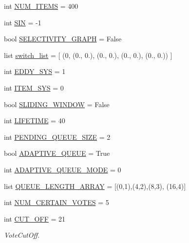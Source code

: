\begin{DoxyCompactItemize}
int \mbox{\hyperlink{namespacereorder_a0948720f253a5f2fc7689b2968c8b619}{N\+U\+M\+\_\+\+I\+T\+E\+MS}} = 400
\item 
int \mbox{\hyperlink{namespacereorder_a46cfe1555e9636aa02be672a0dbfcee8}{S\+IN}} = -\/1
\item 
bool \mbox{\hyperlink{namespacereorder_a7bfe56554845cde1c15e59ba47f471ed}{S\+E\+L\+E\+C\+T\+I\+V\+I\+T\+Y\+\_\+\+G\+R\+A\+PH}} = False
\item 
list \mbox{\hyperlink{namespacereorder_abbafede9e00a5523a3cfea9fc4ff4764}{switch\+\_\+list}} = \mbox{[} (0, (0., 0.), (0., 0.), (0., 0.), (0., 0.)) \mbox{]}
\item 
int \mbox{\hyperlink{namespacereorder_a549d2c90f3f5922ad1442df2113fca1b}{E\+D\+D\+Y\+\_\+\+S\+YS}} = 1
\item 
int \mbox{\hyperlink{namespacereorder_ae8b7db6fd373a0c3225ad361f894aee2}{I\+T\+E\+M\+\_\+\+S\+YS}} = 0
\item 
bool \mbox{\hyperlink{namespacereorder_adf3c8ab64e62d33397a389d7ba49fe69}{S\+L\+I\+D\+I\+N\+G\+\_\+\+W\+I\+N\+D\+OW}} = False
\item 
int \mbox{\hyperlink{namespacereorder_a06966aed6fa634825f18ad256f386496}{L\+I\+F\+E\+T\+I\+ME}} = 40
\item 
int \mbox{\hyperlink{namespacereorder_a642cb0e1f266db761b270ea65af5425a}{P\+E\+N\+D\+I\+N\+G\+\_\+\+Q\+U\+E\+U\+E\+\_\+\+S\+I\+ZE}} = 2
\item 
bool \mbox{\hyperlink{namespacereorder_a5ca20fa392feca13076621985b096ed0}{A\+D\+A\+P\+T\+I\+V\+E\+\_\+\+Q\+U\+E\+UE}} = True
\item 
int \mbox{\hyperlink{namespacereorder_ae5f3a5957b65dd5d074c52ef01e0f732}{A\+D\+A\+P\+T\+I\+V\+E\+\_\+\+Q\+U\+E\+U\+E\+\_\+\+M\+O\+DE}} = 0
\item 
list \mbox{\hyperlink{namespacereorder_af8d4fe75258dd9f8b4c8cdb1b5b68ad1}{Q\+U\+E\+U\+E\+\_\+\+L\+E\+N\+G\+T\+H\+\_\+\+A\+R\+R\+AY}} = \mbox{[}(0,1),(4,2),(8,3), (16,4)\mbox{]}
\item 
int \mbox{\hyperlink{namespacereorder_a157bc167f366f75c9ba8d3e36e8d8540}{N\+U\+M\+\_\+\+C\+E\+R\+T\+A\+I\+N\+\_\+\+V\+O\+T\+ES}} = 5
\item 
int \mbox{\hyperlink{namespacereorder_a914791c176a78c026dc76a18bcd88d73}{C\+U\+T\+\_\+\+O\+FF}} = 21
\begin{DoxyCompactList}\small\item\em Vote\+Cut\+Off. \end{DoxyCompactList}\item 

\end{DoxyCompactItemize}
